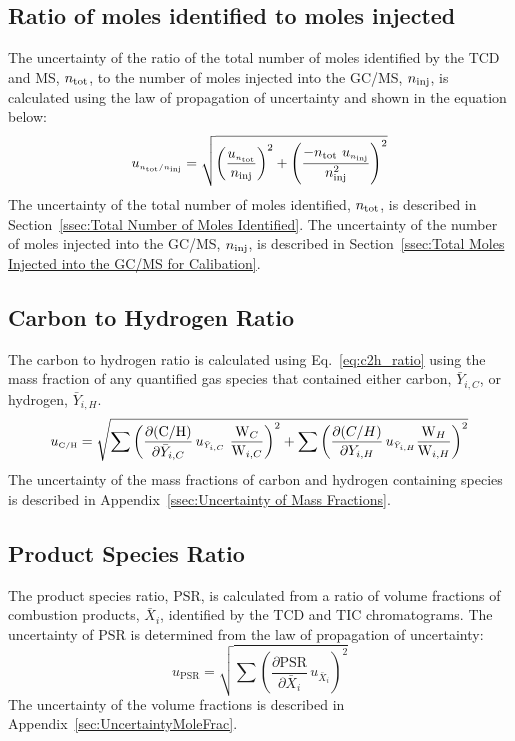 \documentclass[12pt]{article}
\begin{document}
\subsection{Ratio of moles identified to moles injected }
\label{ssec:mole ratio}
The uncertainty of the ratio of the total number of moles identified by the TCD and MS, $n_{\rm tot}$, to the number of moles injected into the GC/MS, $n_{\rm inj}$, is calculated using the law of propagation of uncertainty and shown in the equation below:
\begin{equation}
\label{eq:mol_ratio_uncertainty}
u_{\scriptscriptstyle n_{\rm tot}/n_{\rm inj}} = \sqrt{\left(\frac{u_{\scriptscriptstyle n_{\rm tot}}}{n_{\rm inj}}\right)^2 + \left(\frac{-n_{\rm tot}~u_{\scriptscriptstyle n_{\rm inj}}}{{n_{\rm inj}^2}}\right)^2}
\end{equation}
The uncertainty of the total number of moles identified, $n_{\rm tot}$, is described in Section~\ref{ssec:Total Number of Moles Identified}. The uncertainty of the number of moles injected into the GC/MS, $n_{\rm inj}$, is described in Section~\ref{ssec:Total Moles Injected into the GC/MS for Calibation}.

\subsection{Carbon to Hydrogen Ratio}
\label{ssec:C2H_ratio}
The carbon to hydrogen ratio is calculated using Eq.~\ref{eq:c2h_ratio} using the mass fraction of any quantified gas species that contained either carbon, $\bar{Y}_{i,C}$, or hydrogen, $\bar{Y}_{i,H}$.
\begin{equation}
\label{eq:c2h_uncertainty}
u_{\scriptscriptstyle {\rm C}/{\rm H}} = \sqrt{{\sum\left(\frac{\partial ({\rm C}/{\rm H})}{\partial \bar{Y}_{i,C}}\,u_{\scriptscriptstyle \bar{Y}_{i,C}}~{\frac{\textrm{W}_{C}}{\textrm{W}_{i,C}}} \right)}^2+{\sum\left(\frac{\partial ({C}/{H})}{\partial Y_{i,H}}\,u_{\scriptscriptstyle \bar{Y}_{i,H}}{\frac{\textrm{W}_{H}}{\textrm{W}_{i,H}}} \right)}^2}
\end{equation}
The uncertainty of the mass fractions of carbon and hydrogen containing species is described in Appendix~\ref{ssec:Uncertainty of Mass Fractions}.

\subsection{Product Species Ratio}
\label{ssec:Pro_ratio}
The product species ratio, $\text{PSR}$, is calculated from a ratio of volume fractions of combustion products, $\bar{X}_{i}$, identified by the TCD and TIC chromatograms. The uncertainty of $\text{PSR}$ is determined from the law of propagation of uncertainty:
\begin{equation}
\label{eq:c2h_ratio_uncertainty}
u_{\scriptscriptstyle \text{PSR}} = \sqrt{{\sum\left(\frac{\partial \text{PSR}}{\partial \bar{X}_{i}}\,u_{\scriptscriptstyle \bar{X}_{i}}\right)}^2}
\end{equation}
The uncertainty of the volume fractions is described in Appendix~\ref{sec:UncertaintyMoleFrac}.
\end{document}
